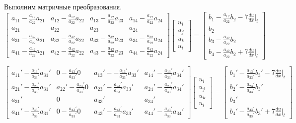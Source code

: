 Выполним матричные преобразования.
$$ \begin{bmatrix}
a_{11} -\frac{a_{12}}{a_{22}}{a_{21}}    &  a_{12} -\frac{a_{12}}{a_{22}}{a_{22}}  &  a_{13} -\frac{a_{12}}{a_{22}}{a_{23}} &  a_{14}-\frac{a_{12}}{a_{22}}{a_{24}}\\
a_{21}     &  a_{22}  &  a_{23} &  a_{24}\\
a_{31} -\frac{a_{32}}{a_{22}}{a_{21}}   &  a_{32}-\frac{a_{32}}{a_{22}}{a_{22}}  &  a_{33}-\frac{a_{32}}{a_{22}}{a_{23}} &  a_{34}-\frac{a_{32}}{a_{22}}{a_{24}}\\
a_{41}  -\frac{a_{42}}{a_{22}}{a_{21}}   &  a_{42} -\frac{a_{42}}{a_{22}}{a_{22}}  & a_{43}-\frac{a_{42}}{a_{22}}{a_{23}}  &  a_{44}-\frac{a_{42}}{a_{22}}{a_{24}}
\end{bmatrix}
\begin{bmatrix}
u_i \\
u_j \\
u_k\\
u_l
\end{bmatrix} =
\begin{bmatrix}
b_1-\frac{a_{12}}{a_{22}}{b_{2}}   -7  \frac{du}{dx}|_i \\
b_2\\
b_3 - \frac{a_{32}}{a_{22}}{b_{2}}\\
b_4 - \frac{a_{42}}{a_{22}}{b_{2}}   +7  \frac{du}{dx}|_l
\end{bmatrix}$$


$$ \begin{bmatrix}
a_{11}'-\frac{a_{13}'}{a_{33}'}a_{31}'   &  0 -\frac{a_{13}'}{a_{33}'}0  &  a_{13}'--\frac{a_{13}'}{a_{33}'}a_{33}' &  a_{14}'-\frac{a_{13}'}{a_{33}'}a_{34}'\\
a_{21}' -\frac{a_{23}'}{a_{33}'}a_{31}'    &  a_{22}' -\frac{a_{23}'}{a_{33}'}0  &  a_{23}' -\frac{a_{23}'}{a_{33}'}a_{33}' &  a_{24}' -\frac{a_{23}'}{a_{33}'}a_{34}'\\
a_{31}'     &  0  &  a_{33}' &  a_{34}'\\
a_{41}'  -\frac{a_{43}'}{a_{33}'}a_{31}'    &  0-\frac{a_{43}'}{a_{33}'}0  & a_{43}'-\frac{a_{43}'}{a_{33}'}a_{33}'  &  a_{44}'-\frac{a_{43}'}{a_{33}'}a_{34}'
\end{bmatrix}
\begin{bmatrix}
u_i \\
u_j \\
u_k\\
u_l
\end{bmatrix} =
\begin{bmatrix}
b_1'-\frac{a_{13}'}{a_{33}'}b_{3}'   -7  \frac{du}{dx}|_i \\
b_2'-\frac{a_{23}'}{a_{33}'}b_{3}'\\
b_3'\\
b_4' -\frac{a_{43}'}{a_{33}'}b_{3}'   +7  \frac{du}{dx}|_l
\end{bmatrix}$$

